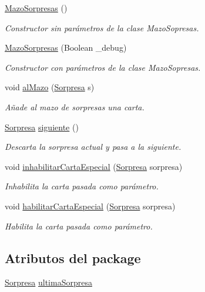 \begin{DoxyCompactItemize}
\item 
\hyperlink{classcivitas_1_1MazoSorpresas_a2a54e95d3d74c8f73f922dc23554af9e}{Mazo\+Sorpresas} ()
\begin{DoxyCompactList}\small\item\em Constructor sin parámetros de la clase Mazo\+Sopresas. \end{DoxyCompactList}\item 
\hyperlink{classcivitas_1_1MazoSorpresas_a2768aba34debb139a79b22c6593e9acf}{Mazo\+Sorpresas} (Boolean \+\_\+debug)
\begin{DoxyCompactList}\small\item\em Constructor con parámetros de la clase Mazo\+Sopresas. \end{DoxyCompactList}\item 
void \hyperlink{classcivitas_1_1MazoSorpresas_a36fbdb305c6555817f1078dec430eddb}{al\+Mazo} (\hyperlink{classcivitas_1_1Sorpresa}{Sorpresa} s)
\begin{DoxyCompactList}\small\item\em Añade al mazo de sorpresas una carta. \end{DoxyCompactList}\item 
\hyperlink{classcivitas_1_1Sorpresa}{Sorpresa} \hyperlink{classcivitas_1_1MazoSorpresas_a667df8429be1bc4efa89b2d80ec92fa6}{siguiente} ()
\begin{DoxyCompactList}\small\item\em Descarta la sorpresa actual y pasa a la siguiente. \end{DoxyCompactList}\item 
void \hyperlink{classcivitas_1_1MazoSorpresas_a2f19b2fb1d7697611f22fd44dc81eed3}{inhabilitar\+Carta\+Especial} (\hyperlink{classcivitas_1_1Sorpresa}{Sorpresa} sorpresa)
\begin{DoxyCompactList}\small\item\em Inhabilita la carta pasada como parámetro. \end{DoxyCompactList}\item 
void \hyperlink{classcivitas_1_1MazoSorpresas_a285260ff3aab3eb49c41d4d274b9dcc1}{habilitar\+Carta\+Especial} (\hyperlink{classcivitas_1_1Sorpresa}{Sorpresa} sorpresa)
\begin{DoxyCompactList}\small\item\em Habilita la carta pasada como parámetro. \end{DoxyCompactList}\end{DoxyCompactItemize}
\subsection*{Atributos del \textquotesingle{}package\textquotesingle{}}
\begin{DoxyCompactItemize}
\item 
\hyperlink{classcivitas_1_1Sorpresa}{Sorpresa} \hyperlink{classcivitas_1_1MazoSorpresas_a0dd98bd2e61ebb5c4dba17e551c2ceac}{ultima\+Sorpresa}
\end{DoxyCompactItemize}
